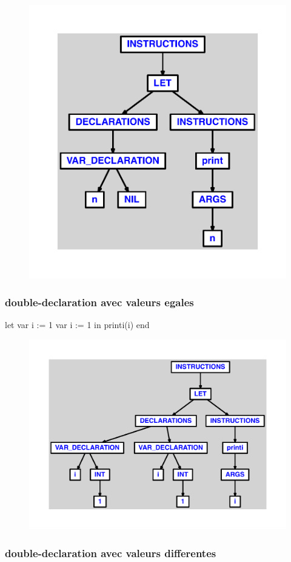 \documentclass{article}
\begin{document}
\begin{figure}[H]\centering\includegraphics[max width=\textwidth]{ast/ast_284.pdf}\end{figure}\subsubsection{double-declaration avec valeurs egales}
\begin{verbatimtab}
let
	var i := 1
	var i := 1
in
	printi(i)
end
\end{verbatimtab}
\begin{figure}[H]\centering\includegraphics[max width=\textwidth]{ast/ast_285.pdf}\end{figure}\subsubsection{double-declaration avec valeurs differentes}
\end{document}
